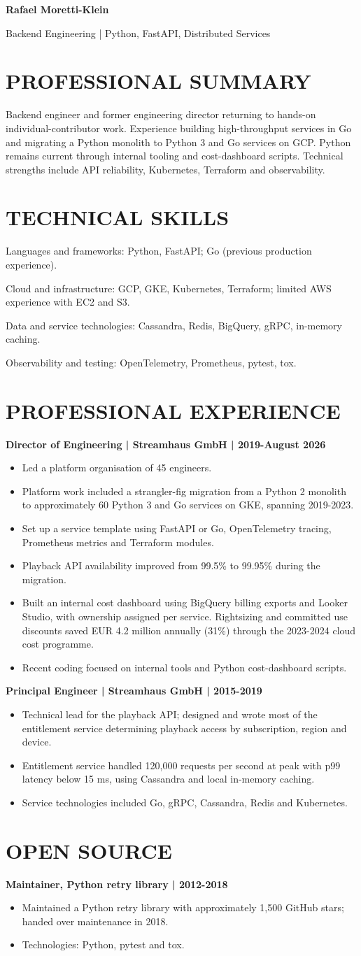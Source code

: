 \documentclass[11pt,a4paper]{article}
\newcommand{\cvsection}[1]{\section*{#1}}
\begin{document}
{\LARGE\bfseries\color{primarycolor} Rafael Moretti-Klein}\par
{\color{accentcolor} Backend Engineering | Python, FastAPI, Distributed Services}

\cvsection{PROFESSIONAL SUMMARY}
Backend engineer and former engineering director returning to hands-on individual-contributor work. Experience building high-throughput services in Go and migrating a Python monolith to Python 3 and Go services on GCP. Python remains current through internal tooling and cost-dashboard scripts. Technical strengths include API reliability, Kubernetes, Terraform and observability.

\cvsection{TECHNICAL SKILLS}
Languages and frameworks: Python, FastAPI; Go (previous production experience).\par
Cloud and infrastructure: GCP, GKE, Kubernetes, Terraform; limited AWS experience with EC2 and S3.\par
Data and service technologies: Cassandra, Redis, BigQuery, gRPC, in-memory caching.\par
Observability and testing: OpenTelemetry, Prometheus, pytest, tox.

\cvsection{PROFESSIONAL EXPERIENCE}
\textbf{Director of Engineering | Streamhaus GmbH | 2019-August 2026}
\begin{itemize}
\item Led a platform organisation of 45 engineers.
\item Platform work included a strangler-fig migration from a Python 2 monolith to approximately 60 Python 3 and Go services on GKE, spanning 2019-2023.
\item Set up a service template using FastAPI or Go, OpenTelemetry tracing, Prometheus metrics and Terraform modules.
\item Playback API availability improved from 99.5\% to 99.95\% during the migration.
\item Built an internal cost dashboard using BigQuery billing exports and Looker Studio, with ownership assigned per service. Rightsizing and committed use discounts saved EUR 4.2 million annually (31\%) through the 2023-2024 cloud cost programme.
\item Recent coding focused on internal tools and Python cost-dashboard scripts.
\end{itemize}
\textbf{Principal Engineer | Streamhaus GmbH | 2015-2019}
\begin{itemize}
\item Technical lead for the playback API; designed and wrote most of the entitlement service determining playback access by subscription, region and device.
\item Entitlement service handled 120,000 requests per second at peak with p99 latency below 15 ms, using Cassandra and local in-memory caching.
\item Service technologies included Go, gRPC, Cassandra, Redis and Kubernetes.
\end{itemize}

\cvsection{OPEN SOURCE}
\textbf{Maintainer, Python retry library | 2012-2018}
\begin{itemize}
\item Maintained a Python retry library with approximately 1,500 GitHub stars; handed over maintenance in 2018.
\item Technologies: Python, pytest and tox.
\end{itemize}
\end{document}
